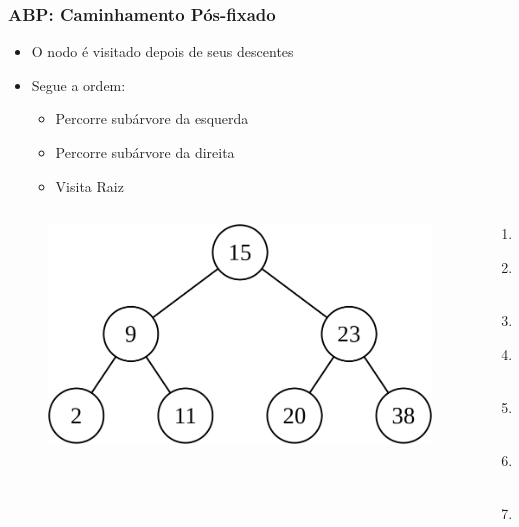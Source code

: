\documentclass[aspectratio=169]{beamer}
\begin{document}
\begin{frame}\frametitle{ABP: Caminhamento Pós-fixado}
\begin{itemize}
	\item O nodo é visitado depois de seus descentes
	\item Segue a ordem:
	\begin{itemize}
		\item Percorre subárvore da esquerda
		\item Percorre subárvore da direita
		\item Visita Raiz
	\end{itemize}
\end{itemize}
\begin{columns}[T]
\begin{column}{0.7\linewidth}
\begin{figure}[h]
	\centering
	\includegraphics[height=0.3\paperheight]{imagens/abp02.png}
\end{figure}
\end{column}
\begin{column}{0.3\linewidth}
\pause
\begin{enumerate}
	\small
	\item 2
	\item 11
	\item 9
	\item 20
	\item 38
	\item 23
	\item 15
\end{enumerate}
\end{column}
\end{columns}
\end{frame}
\end{document}
